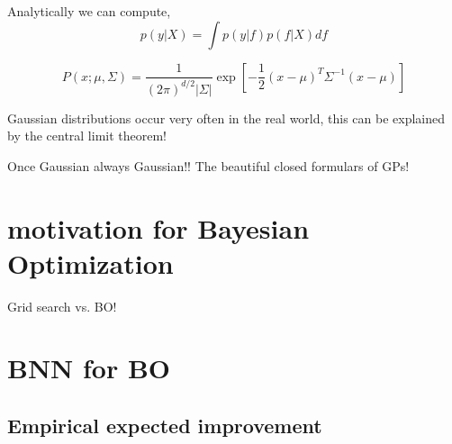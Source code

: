 Analytically we can compute, $$p(y|X)=\int p(y|f)p(f|X)df$$ 



$$P(x;\mu, \Sigma) = \frac{1}{(2\pi)^{d/2}|\Sigma|} \exp \left[-\frac{1}{2}(x-\mu)^T\Sigma^{-1}(x-\mu) \right]$$

Gaussian distributions occur very often in the real world, this can be explained by the central limit theorem! 

Once Gaussian always Gaussian!!
The beautiful closed formulars of GPs! 

\section{motivation for Bayesian Optimization}
Grid search vs. BO!

\section{BNN for BO}
\subsection{Empirical expected improvement}